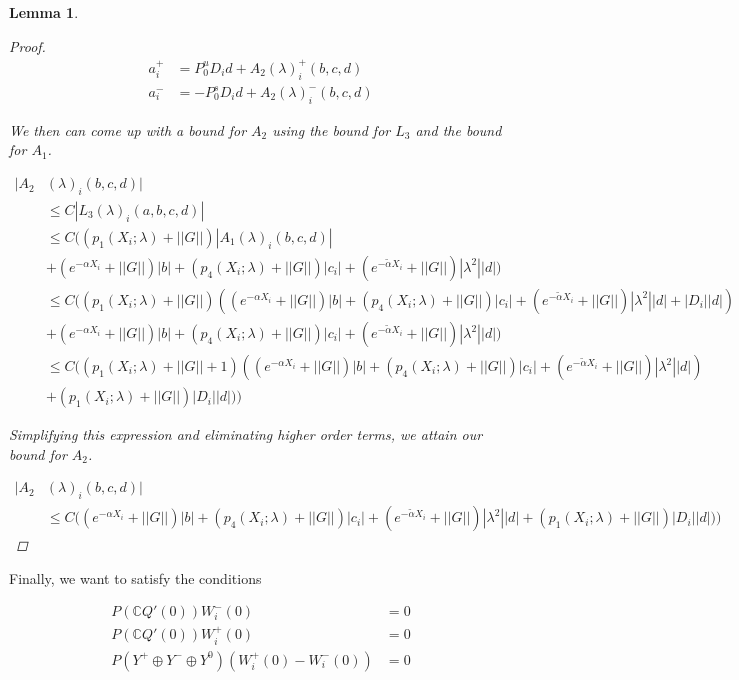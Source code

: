 \documentclass[12pt]{article}
\def\C{{\mathbb C}}
\newtheorem{lemma}{Lemma}
\begin{document}
\begin{lemma}
\begin{proof}
\begin{align*}
a_i^+ &= P^u_0 D_i d + A_2(\lambda)_i^+(b, c, d) \\
a_i^- &= -P^s_0 D_i d + A_2(\lambda)_i^-(b, c, d)
\end{align*}

We then can come up with a bound for $A_2$ using the bound for $L_3$ and the bound for $A_1$.

\begin{align*}
|A_2&(\lambda)_i(b, c, d)| \\
&\leq C |L_3(\lambda)_i(a, b, c, d)| \\
&\leq C \Big( (p_1(X_i; \lambda) + ||G|| )|A_1(\lambda)_i(b, c, d)| \\
&+ (e^{-\alpha X_i} + ||G||)|b| + ( p_4(X_i; \lambda) + ||G|| )|c_i| + (e^{-\tilde{\alpha} X_i} + ||G||) |\lambda^2| |d| \Big) \\
&\leq C \Big( (p_1(X_i; \lambda) + ||G|| )( (e^{-\alpha X_i} + ||G||)|b| + ( p_4(X_i; \lambda) + ||G|| )|c_i| + (e^{-\tilde{\alpha} X_i} + ||G||) |\lambda^2| |d| + |D_i||d|)  \\
&+ (e^{-\alpha X_i} + ||G||)|b| + ( p_4(X_i; \lambda) + ||G|| )|c_i| + (e^{-\tilde{\alpha} X_i} + ||G||) |\lambda^2| |d| \Big) \\
&\leq C \Big( (p_1(X_i; \lambda) + ||G|| + 1)((e^{-\alpha X_i} + ||G||)|b| 
+ ( p_4(X_i; \lambda) + ||G|| )|c_i| + (e^{-\tilde{\alpha} X_i} + ||G||) |\lambda^2| |d|)\\
&+(p_1(X_i; \lambda) + ||G|| )|D_i||d|) \Big)
\end{align*}

Simplifying this expression and eliminating higher order terms, we attain our bound for $A_2$.

\begin{align*}
|A_2&(\lambda)_i(b, c, d)| \\
&\leq C \Big( (e^{-\alpha X_i} + ||G||)|b| + ( p_4(X_i; \lambda) + ||G|| )|c_i| + (e^{-\tilde{\alpha} X_i} + ||G||) |\lambda^2| |d| +(p_1(X_i; \lambda) + ||G|| )|D_i||d|) \Big)
\end{align*}

\end{proof}
\end{lemma}

Finally, we want to satisfy the conditions

\begin{align*}
P(\C Q'(0))W_i^-(0) &= 0 \\
P(\C Q'(0))W_i^+(0) &= 0 \\
P(Y^+ \oplus Y^- \oplus Y^0) ( W_i^+(0) - W_i^-(0) ) &= 0
\end{align*}
\end{document}
